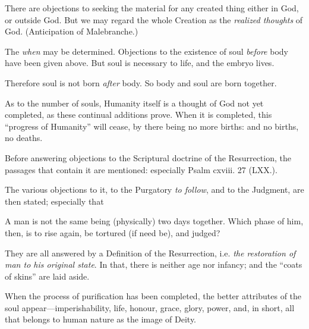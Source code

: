 There are objections to seeking the material for any created thing either in God, or outside God. But we may regard the whole Creation as the \emph{realized thoughts} of God. (Anticipation of Malebranche.)

The \emph{when} may be determined. Objections to the existence of soul \emph{before} body have been given above. But soul is necessary to life, and the embryo lives.

Therefore soul is not born \emph{after} body. So body and soul are born together.

As to the number of souls, Humanity itself is a thought of God not yet completed, as these continual additions prove. When it is completed, this “progress of Humanity” will cease, by there being no more births: and no births, no deaths.

Before answering objections to the Scriptural doctrine of the Resurrection, the passages that contain it are mentioned: especially Psalm cxviii. 27 (LXX.).

The various objections to it, to the Purgatory \emph{to follow}, and to the Judgment, are then stated; especially that

A man is not the same being (physically) two days together. Which phase of him, then, is to rise again, be tortured (if need be), and judged?

They are all answered by a Definition of the Resurrection, i.e. \emph{the restoration of man to his original state}. In that, there is neither age nor infancy; and the “coats of skins” are laid aside.

When the process of purification has been completed, the better attributes of the soul appear—imperishability, life, honour, grace, glory, power, and, in short, all that belongs to human nature as the image of Deity.


